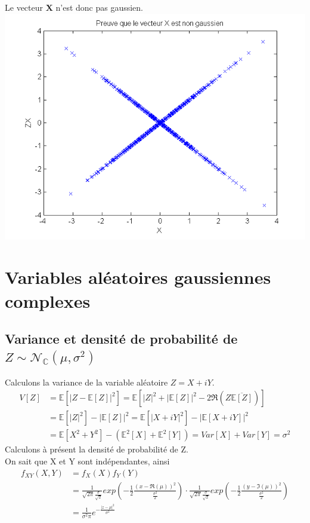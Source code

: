 \documentclass{report}
\begin{document}
			Le vecteur $\textbf{X}$ n'est donc pas gaussien. \\
			\includegraphics[scale=0.7]{sources/Q224.png}
	\section{Variables aléatoires gaussiennes complexes}
		\subsection{Variance et densité de probabilité de $Z \sim \mathcal{N}_{\mathbb{C}}(\mu, \sigma^2)$}
			Calculons la variance de la variable aléatoire $Z = X + iY$.
			\begin{align*}
				V[Z] &= \mathbb{E}\left[|Z-\mathbb{E}[Z]|^2\right] = \mathbb{E}\left[|Z|^2+|\mathbb{E}[Z]|^2-2\Re(Z\overline{\mathbb{E}[Z]})\right]\\
				&= \mathbb{E}[|Z|^2]-|\mathbb{E}[Z]|^2 = \mathbb{E}[|X+iY|^2]-|\mathbb{E}[X+iY]|^2\\ 
				&= \mathbb{E}[X^2+Y^2] - (\mathbb{E}^2[X] + \mathbb{E}^2[Y]) = Var[X] + Var[Y] = \sigma^2
			\end{align*}
			Calculons à présent la densité de probabilité de Z.\\
			On sait que X et Y sont indépendantes, ainsi
			\begin{align*}
				f_{XY}(X,Y) &= f_X(X)f_Y(Y)\\
				&= \frac{1}{\sqrt{2\pi}\frac{\sigma}{\sqrt{2}}}exp(-\frac{1}{2}\frac{(x-\Re(\mu))^2}{\frac{\sigma^2}{2}}) \cdot \frac{1}{\sqrt{2\pi}\frac{\sigma}{\sqrt{2}}}exp(-\frac{1}{2}\frac{(y-\Im(\mu))^2}{\frac{\sigma^2}{2}})\\
				&= \frac{1}{\sigma^2\pi}e^{-\frac{|z-\mu|^2}{\sigma^2}}
			\end{align*}
\end{document}
